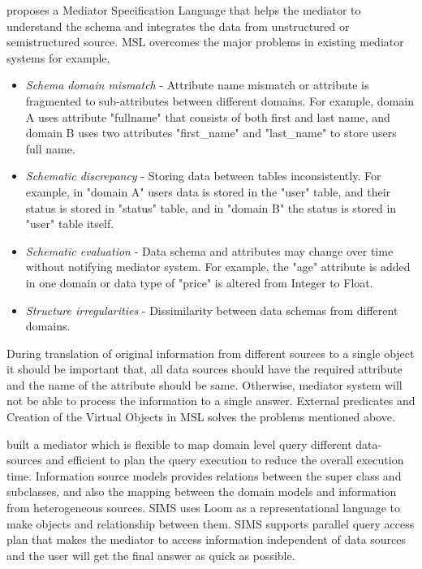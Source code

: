 	\citet{papakonstantinou1996medmaker} proposes a Mediator Specification Language that helps the mediator to understand the schema and integrates the data from unstructured or semistructured source. MSL overcomes the major problems in existing mediator systems for example,
	\begin{itemize}
		\item \emph{Schema domain mismatch} - Attribute name mismatch or attribute is fragmented to sub-attributes between different domains. For example, domain A uses attribute "fullname" that consists of both first and last name, and domain B uses two attributes "first\_name" and "last\_name" to store users full name.
		\item \emph{Schematic discrepancy} - Storing data between tables inconsistently. For example, in "domain A" users data is stored in the "user" table, and their status is stored in "status" table, and in "domain B" the status is stored in "user" table itself.
		\item \emph{Schematic evaluation} - Data schema and attributes may change over time without notifying mediator system. For example, the "age" attribute is added in one domain or data type of "price" is altered from Integer to Float.
		\item \emph{Structure irregularities} - Dissimilarity between data schemas from different domains.
	\end{itemize}
	
	During translation of original information from different sources to a single object it should be important that, all data sources should have the required attribute and the name of the attribute should be same. Otherwise, mediator system will not be able to process the information to a single answer.  External predicates and Creation of the Virtual Objects in MSL solves the problems mentioned above.
	
	\citet{arens1996query} built a mediator which is flexible to map domain level query different data-sources and efficient to plan the query execution to reduce the overall execution time. Information source models provides relations between the super class and subclasses, and also the mapping between the domain models and information from heterogeneous sources. SIMS uses Loom as a representational language to make objects and relationship between them. SIMS supports parallel query access plan that makes the mediator to access information independent of data sources and the user will get the final answer as quick as possible.
	
